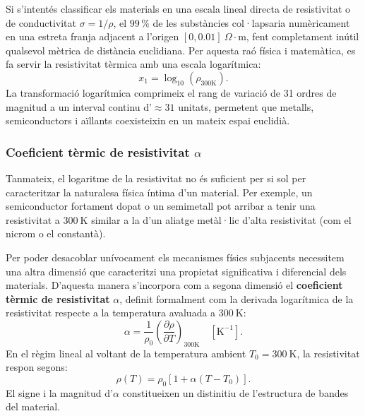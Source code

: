 \documentclass[a4paper,11pt]{article}
\begin{document}
Si s'intentés classificar els materials en una escala lineal directa de resistivitat o de conductivitat $\sigma = 1/\rho$, el $99\,\%$ de les substàncies col·lapsaria numèricament en una estreta franja adjacent a l'origen $[0, 0.01]\ \Omega\cdot\text{m}$, fent completament inútil qualsevol mètrica de distància euclidiana. Per aquesta raó física i matemàtica, es fa servir la resistivitat tèrmica amb una escala logarítmica:
\begin{equation}
    x_1 = \log_{10}(\rho_{300\mathrm{K}}).
\end{equation}
La transformació logarítmica comprimeix el rang de variació de 31 ordres de magnitud a un interval continu d'$\approx 31$ unitats, permetent que metalls, semiconductors i aïllants coexisteixin en un mateix espai euclidià.

\subsubsection{Coeficient tèrmic de resistivitat $\alpha$}

Tanmateix, el logaritme de la resistivitat no és suficient per si sol per caracteritzar la naturalesa física íntima d'un material. Per exemple, un semiconductor fortament dopat o un semimetall pot arribar a tenir una resistivitat a $300\ \text{K}$ similar a la d'un aliatge metàl·lic d'alta resistivitat (com el nicrom o el constantà).

Per poder desacoblar unívocament els mecanismes físics subjacents necessitem una altra dimensió que caracteritzi una propietat significativa i diferencial dels materials. D'aquesta manera s'incorpora com a segona dimensió el \textbf{coeficient tèrmic de resistivitat} $\alpha$, definit formalment com la derivada logarítmica de la resistivitat respecte a la temperatura avaluada a $300\ \text{K}$:
\begin{equation}
    \alpha = \frac{1}{\rho_0} \left(\frac{\partial \rho}{\partial T}\right)_{300\mathrm{K}} \quad [\text{K}^{-1}].
    \label{eq:alpha}
\end{equation}
En el règim lineal al voltant de la temperatura ambient $T_0 = 300\ \text{K}$, la resistivitat respon segons:
\begin{equation}
    \rho(T) = \rho_0 \left[1 + \alpha(T - T_0)\right].
    \label{eq:rho_temp}
\end{equation}
El signe i la magnitud d'$\alpha$ constitueixen un distinitiu de l'estructura de bandes del material.

\end{document}
